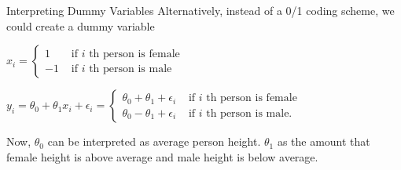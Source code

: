 \documentclass{beamer}
\begin{document}
    \begin{frame}{Interpreting Dummy Variables}
    Alternatively, instead of a 0/1 coding scheme, we could create a dummy variable
    
    \pause \(x_{i}=\left\{\begin{array}{ll}{1} & {\text { if } i \text { th person is female }} \\ {-1} & {\text { if } i \text { th person is male }}\end{array}\right.\)
    
    \pause \(y_{i}=\theta_{0}+\theta_{1} x_{i}+\epsilon_{i}=\left\{\begin{array}{ll}{\theta_{0}+\theta_{1}+\epsilon_{i}} & {\text { if } i \text { th person is female }} \\ {\theta_{0}-\theta_{1}+\epsilon_{i}} & {\text { if } i \text { th person is male. }}\end{array}\right.\)
    
    
    \pause Now, $\theta_{0}$ can be interpreted as average person height. $\theta_{1}$ as the amount that female height is above average and male height is below average.
    \end{frame}
\end{document}
